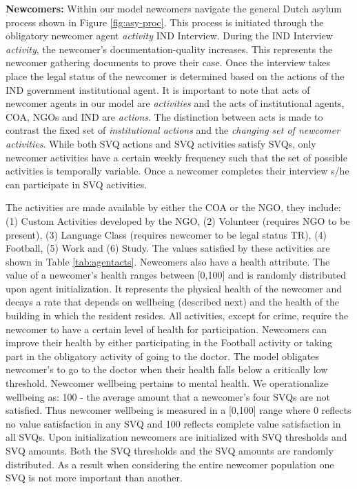 \documentclass{scspaperproc}
\theoremstyle{scsthe}
\begin{document}
{\bf Newcomers:} Within our model newcomers navigate the general Dutch asylum process shown in Figure \ref{fig:asy-proc}. This process is initiated through the obligatory newcomer agent \emph{activity} IND Interview. During the IND Interview \emph{activity}, the newcomer's documentation-quality increases. This represents the newcomer gathering documents to prove their case. Once the interview takes place the legal status of the newcomer is determined based on the actions of the IND government institutional agent. It is important to note that acts of newcomer agents in our model are \emph{activities} and the acts of institutional agents, COA, NGOs and IND are \emph{actions}. The distinction between acts is made to contrast the fixed set of \emph{institutional actions} and the \emph{changing set of newcomer activities}. While both SVQ actions and SVQ activities satisfy SVQs, only newcomer activities have a certain weekly frequency such that the set of possible activities is temporally variable. Once a newcomer completes their interview s/he can participate in SVQ activities. 

The activities are made available by either the COA or the NGO, they include: (1) Custom Activities developed by the NGO, (2) Volunteer (requires NGO to be present), (3) Language Class (requires newcomer to be legal status TR), (4) Football, (5) Work and (6) Study. The values satisfied by these activities are shown in Table \ref{tab:agentacts}. Newcomers also have a health attribute. The value of a newcomer's health ranges between [0,100] and is randomly distributed upon agent initialization. It represents the physical health of the newcomer and decays a rate that depends on wellbeing (described next) and the health of the building in which the resident resides. All activities, except for crime, require the newcomer to have a certain level of health for participation. Newcomers can improve their health by either participating in the Football activity or taking part in the obligatory activity of going to the doctor. The model obligates newcomer's to go to the doctor when their health falls below a critically low threshold. Newcomer wellbeing pertains to mental health. We operationalize wellbeing as: 100 - the average amount that a newcomer's four SVQs are not satisfied. Thus newcomer wellbeing is measured in a [0,100] range where 0 reflects no value satisfaction in any SVQ and 100 reflects complete value satisfaction in all SVQs. Upon initialization newcomers are initialized with SVQ thresholds and SVQ amounts. Both the SVQ thresholds and the SVQ amounts are randomly distributed. As a result when considering the entire newcomer population one SVQ is not more important than another. 
\end{document}
